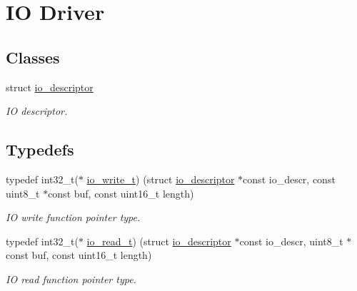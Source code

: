 \hypertarget{group__doc__driver__hal__helper__io}{}\section{IO Driver}
\label{group__doc__driver__hal__helper__io}
\subsection*{Classes}
\begin{DoxyCompactItemize}
\item 
struct \hyperlink{structio__descriptor}{io\+\_\+descriptor}
\begin{DoxyCompactList}\small\item\em IO descriptor. \end{DoxyCompactList}\end{DoxyCompactItemize}
\subsection*{Typedefs}
\begin{DoxyCompactItemize}
\item 
\mbox{\label{group__doc__driver__hal__helper__io_gacb03c48993a6786f00946c196c40add1}} 
typedef int32\+\_\+t($\ast$ \hyperlink{group__doc__driver__hal__helper__io_gacb03c48993a6786f00946c196c40add1}{io\+\_\+write\+\_\+t}) (struct \hyperlink{structio__descriptor}{io\+\_\+descriptor} $\ast$const io\+\_\+descr, const uint8\+\_\+t $\ast$const buf, const uint16\+\_\+t length)
\begin{DoxyCompactList}\small\item\em IO write function pointer type. \end{DoxyCompactList}\item 
\mbox{\label{group__doc__driver__hal__helper__io_ga4d9ae58de2887289fe09eac6f0aa8be7}} 
typedef int32\+\_\+t($\ast$ \hyperlink{group__doc__driver__hal__helper__io_ga4d9ae58de2887289fe09eac6f0aa8be7}{io\+\_\+read\+\_\+t}) (struct \hyperlink{structio__descriptor}{io\+\_\+descriptor} $\ast$const io\+\_\+descr, uint8\+\_\+t $\ast$const buf, const uint16\+\_\+t length)
\begin{DoxyCompactList}\small\item\em IO read function pointer type. \end{DoxyCompactList}\end{DoxyCompactItemize}
